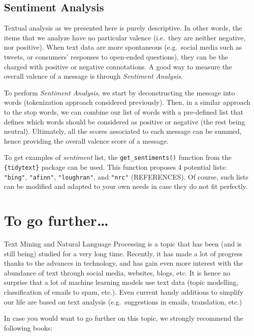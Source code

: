 \documentclass[
]{krantz}
\begin{document}
\hypertarget{sentiment-analysis}{%
\subsection{Sentiment Analysis}\label{sentiment-analysis}}

Textual analysis as we presented here is purely descriptive. In other words, the items that we analyze have no particular valence (i.e.~they are neither negative, nor positive). When text data are more spontaneous (e.g.~social media such as tweets, or consumers' responses to open-ended questions), they can be the charged with positive or negative connotations. A good way to measure the overall valence of a message is through \emph{Sentiment Analysis}.

To perform \emph{Sentiment Analysis}, we start by deconstructing the message into words (tokenization approach considered previously). Then, in a similar approach to the stop words, we can combine our list of words with a pre-defined list that defines which words should be considered as positive or negative (the rest being neutral). Ultimately, all the scores associated to each message can be summed, hence providing the overall valence score of a message.

To get examples of \emph{sentiment} list, the \texttt{get\_sentiments()} function from the \texttt{\{tidytext\}} package can be used. This function proposes 4 potential lists: \texttt{"bing"}, \texttt{"afinn"}, \texttt{"loughran"}, and \texttt{"nrc"} (REFERENCES). Of course, such lists can be modified and adapted to your own needs in case they do not fit perfectly.

\hypertarget{to-go-further-1}{%
\section{To go further\ldots{}}\label{to-go-further-1}}

Text Mining and Natural Language Processing is a topic that has been (and is still being) studied for a very long time. Recently, it has made a lot of progress thanks to the advances in technology, and has gain even more interest with the abundance of text through social media, websites, blogs, etc. It is hence no surprise that a lot of machine learning models use text data (topic modelling, classification of emails to spam, etc.). Even current handy additions to simplify our life are based on text analysis (e.g.~suggestions in emails, translation, etc.)

In case you would want to go further on this topic, we strongly recommend the following books:
\end{document}
